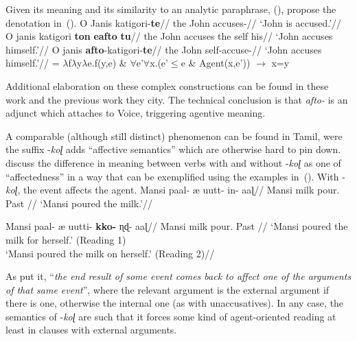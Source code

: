{Given its meaning and its similarity to an analytic paraphrase, (\nextx), \cite{spathasetal15} propose the denotation in~(\anextx).
\pex \citep[63--64]{alexiadouafto}
	\a \begingl
		\gla O Janis katigori-\textbf{te}//
		\glb the John accuses-//
		\glft `John is accused.'//
	\endgl
	\a \begingl
		\gla O janis katigori \textbf{ton} \textbf{eafto} \textbf{tu}//
		\glb the John accuses the self his//
		\glft `John accuses himself.'//
	\endgl
	\a \begingl
		\gla O janis \textbf{afto}-katigori-\textbf{te}//
		\glb the John self-accuse-//
		\glft `John accuses himself.'//
	\endgl
\xe
\ex {} = $\lambda$f$\lambda$y$\lambda$e.f(y,e) \& $\forall$e'$\forall$x.(e'$\le$e \& Agent(x,e')) $\rightarrow$ x=y \hfill \citep[1335]{spathasetal15}
\xe

Additional elaboration on these complex constructions can be found in these work and the previous work they city. The technical conclusion is that \emph{afto-} is an adjunct which attaches to Voice, triggering agentive meaning.

A comparable (although still distinct) phenomenon can be found in Tamil, were the suffix -\emph{koɭ} adds ``affective semantics'' which are otherwise hard to pin down. \cite{sundaresanmcfadden17} discuss the difference in meaning between verbs with and without -\emph{koɭ} as one of ``affectedness'' in a way that can be exemplified using the examples in~(\nextx). With -\emph{koɭ}, the event affects the agent.
\pex
	\a \begingl
	\gla Mansi paal- æ uutt- in- aaɭ//
	\glb Mansi milk  pour. Past //
	\glft `Mansi poured the milk.'//
	\endgl

	\a 	\begingl
	\gla Mansi paal- æ uutti- \textbf{kko-} ɳɖ- aaɭ//
	\glb Mansi milk  pour.  Past //
	\glft `Mansi poured the milk for herself.' (Reading 1)\\
		`Mansi poured the milk on herself.' (Reading 2)//
	\endgl
\xe

As \citet[165]{sundaresanmcfadden17} put it, ``\emph{the end result of some event comes back to affect one of the arguments of that same event}'', where the relevant argument is the external argument if there is one, otherwise the internal one (as with unaccusatives). In any case, the semantics of -\emph{koɭ} are such that it forces some kind of agent-oriented reading at least in clauses with external arguments.

}
